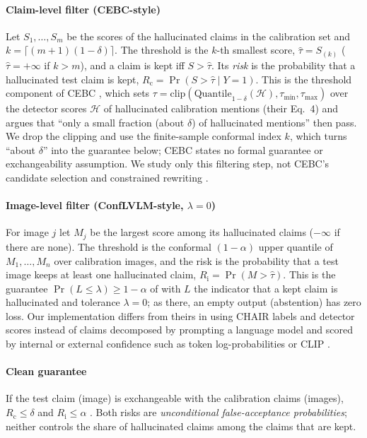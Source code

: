 \paragraph{Claim-level filter (CEBC-style)} Let $S_1,\dots,S_m$ be the scores of the hallucinated claims in the calibration set and $k=\lceil (m+1)(1-\delta)\rceil$. The threshold is the $k$-th smallest score, $\hat\tau=S_{(k)}$ ($\hat\tau=+\infty$ if $k>m$), and a claim is kept iff $S>\hat\tau$. Its \emph{risk} is the probability that a hallucinated test claim is kept, $R_{\mathrm{c}}=\Pr(S>\hat\tau\mid Y=1)$. This is the threshold component of CEBC \citep[Sec.~3.3]{cebc}, which sets $\tau=\mathrm{clip}(\mathrm{Quantile}_{1-\delta}(\mathcal H),\tau_{\min},\tau_{\max})$ over the detector scores $\mathcal H$ of hallucinated calibration mentions (their Eq.~4) and argues that ``only a small fraction (about $\delta$) of hallucinated mentions'' then pass. We drop the clipping and use the finite-sample conformal index $k$, which turns ``about $\delta$'' into the guarantee below; CEBC states no formal guarantee or exchangeability assumption. We study only this filtering step, not CEBC's candidate selection and constrained rewriting \citep[Sec.~3.6]{cebc}.

\paragraph{Image-level filter (ConfLVLM-style, $\lambda=0$)} For image $j$ let $M_j$ be the largest score among its hallucinated claims ($-\infty$ if there are none). The threshold is the conformal $(1-\alpha)$ upper quantile of $M_1,\dots,M_n$ over calibration images, and the risk is the probability that a test image keeps at least one hallucinated claim, $R_{\mathrm{i}}=\Pr(M>\hat\tau)$. This is the guarantee $\Pr(L\le\lambda)\ge1-\alpha$ of \citet[Eq.~1]{conflvlm} with $L$ the indicator that a kept claim is hallucinated and tolerance $\lambda=0$; as there, an empty output (abstention) has zero loss. Our implementation differs from theirs in using CHAIR labels and detector scores instead of claims decomposed by prompting a language model and scored by internal or external confidence such as token log-probabilities or CLIP \citep[Secs.~3--4]{conflvlm}.

\paragraph{Clean guarantee} If the test claim (image) is exchangeable with the calibration claims (images), $R_{\mathrm{c}}\le\delta$ and $R_{\mathrm{i}}\le\alpha$ \citep{vovk2005algorithmic,angelopoulos2023gentle}. Both risks are \emph{unconditional false-acceptance probabilities}; neither controls the share of hallucinated claims among the claims that are kept.


